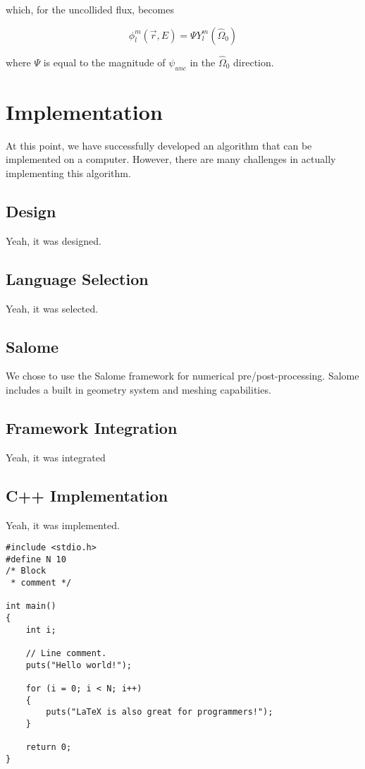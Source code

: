 \documentclass{article}
\numberwithin{equation}{subsection}
\begin{document}
which, for the uncollided flux, becomes

\begin{equation}
\phi_l^m(\vec{r}, E) = \Psi Y_l^m(\hat{\Omega}_0)
\end{equation}

where $\Psi$ is equal to the magnitude of $\psi_{unc}$ in the $\hat{\Omega}_0$ direction.

\section{Implementation}
At this point, we have successfully developed an algorithm that can be implemented on a computer. However, there are many challenges in actually implementing this algorithm.

\subsection{Design}
Yeah, it was designed.

\subsection{Language Selection}
Yeah, it was selected.

\subsection{Salome}
We chose to use the Salome framework for numerical pre/post-processing. Salome includes a built in geometry system and meshing capabilities.

\subsection{Framework Integration}
Yeah, it was integrated

\subsection{C++ Implementation}
Yeah, it was implemented.

\begin{lstlisting}
#include <stdio.h>
#define N 10
/* Block
 * comment */

int main()
{
    int i;

    // Line comment.
    puts("Hello world!");
    
    for (i = 0; i < N; i++)
    {
        puts("LaTeX is also great for programmers!");
    }

    return 0;
}
\end{lstlisting}
\end{document}
